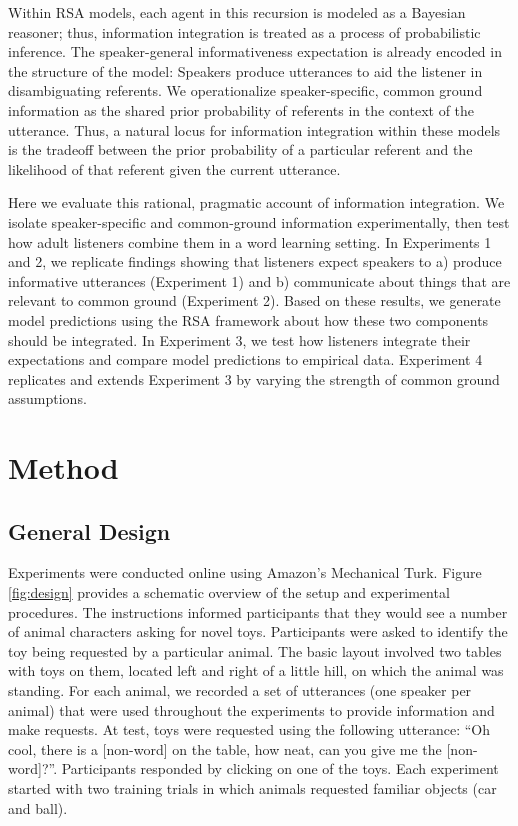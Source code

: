 \documentclass[10pt, letterpaper]{article}
\begin{document}
Within RSA models, each agent in this recursion is modeled as a Bayesian
reasoner; thus, information integration is treated as a process of
probabilistic inference. The speaker-general informativeness expectation
is already encoded in the structure of the model: Speakers produce
utterances to aid the listener in disambiguating referents. We
operationalize speaker-specific, common ground information as the shared
prior probability of referents in the context of the utterance. Thus, a
natural locus for information integration within these models is the
tradeoff between the prior probability of a particular referent and the
likelihood of that referent given the current utterance.

Here we evaluate this rational, pragmatic account of information
integration. We isolate speaker-specific and common-ground information
experimentally, then test how adult listeners combine them in a word
learning setting. In Experiments 1 and 2, we replicate findings showing
that listeners expect speakers to a) produce informative utterances
(Experiment 1) and b) communicate about things that are relevant to
common ground (Experiment 2). Based on these results, we generate model
predictions using the RSA framework about how these two components
should be integrated. In Experiment 3, we test how listeners integrate
their expectations and compare model predictions to empirical data.
Experiment 4 replicates and extends Experiment 3 by varying the strength
of common ground assumptions.

\section{Method}\label{method}

\subsection{General Design}\label{general-design}

Experiments were conducted online using Amazon's Mechanical Turk. Figure
\ref{fig:design} provides a schematic overview of the setup and
experimental procedures. The instructions informed participants that
they would see a number of animal characters asking for novel toys.
Participants were asked to identify the toy being requested by a
particular animal. The basic layout involved two tables with toys on
them, located left and right of a little hill, on which the animal was
standing. For each animal, we recorded a set of utterances (one speaker
per animal) that were used throughout the experiments to provide
information and make requests. At test, toys were requested using the
following utterance: ``Oh cool, there is a {[}non-word{]} on the table,
how neat, can you give me the {[}non-word{]}?''. Participants responded
by clicking on one of the toys. Each experiment started with two
training trials in which animals requested familiar objects (car and
ball).
\end{document}
